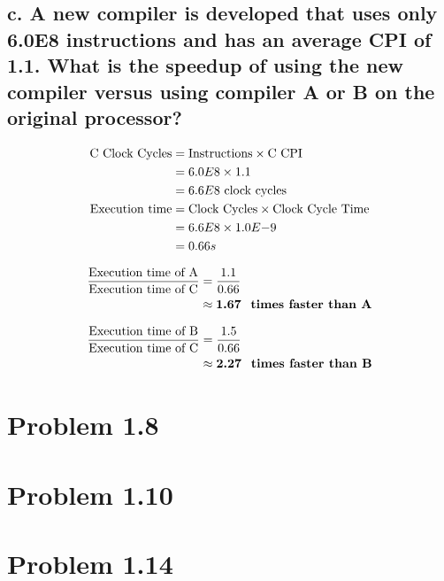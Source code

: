 \documentclass[12pt]{article}
\begin{document}
\subsection*{\small c. A new compiler is developed that uses only 6.0E8 instructions and has an average CPI of 1.1. What is the speedup of using the new compiler versus using compiler A or B on the original processor?}

\begin{align*}
\textrm{C Clock Cycles} & = \textrm{Instructions} \times \textrm{C CPI}\\
& = 6.0E8 \times 1.1\\
& = 6.6E8 \textrm{ clock cycles}\\
\textrm{Execution time} & = \textrm{Clock Cycles} \times \textmd{Clock Cycle Time}\\
& = 6.6E8 \times 1.0E{-9}\\
& = 0.66 s
\end{align*}

\begin{align*}
\frac{\textrm{Execution time of A}}{\textrm{Execution time of C}} & = \frac{1.1}{0.66}\\
& \approx \textbf{1.67 \textrm{ times faster than A}}
\end{align*}

\begin{align*}
\frac{\textrm{Execution time of B}}{\textrm{Execution time of C}} & = \frac{1.5}{0.66}\\
& \approx \textbf{2.27 \textrm{ times faster than B}}
\end{align*}
\section*{Problem 1.8}

\section*{Problem 1.10}

\section*{Problem 1.14}
\end{document}
